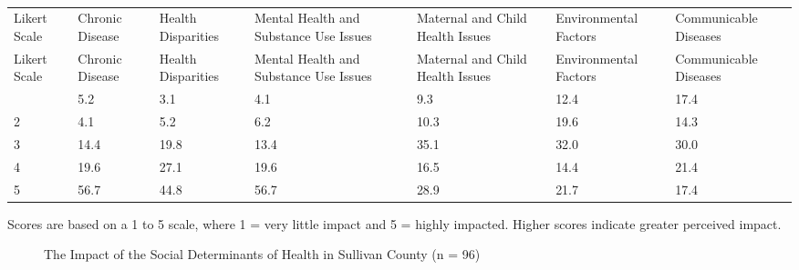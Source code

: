 \documentclass[
  english,
  letterpaper,
]{report}
\begin{document}
\begin{longtable}[]{@{}lllllll@{}}

\caption{\label{tbl-sc-impact-hlth-issue}The Impact of Health Issues in
Sullivan County (n = 98)}

\tabularnewline

\caption{}\label{T_33174}\tabularnewline
\toprule\noalign{}
Likert Scale & Chronic Disease & Health Disparities & Mental Health and
Substance Use Issues & Maternal and Child Health Issues & Environmental
Factors & Communicable Diseases \\
\midrule\noalign{}
\endfirsthead
\toprule\noalign{}
Likert Scale & Chronic Disease & Health Disparities & Mental Health and
Substance Use Issues & Maternal and Child Health Issues & Environmental
Factors & Communicable Diseases \\
\midrule\noalign{}
\endhead
\bottomrule\noalign{}
\endlastfoot
1 & 5.2 & 3.1 & 4.1 & 9.3 & 12.4 & 17.4 \\
2 & 4.1 & 5.2 & 6.2 & 10.3 & 19.6 & 14.3 \\
3 & 14.4 & 19.8 & 13.4 & 35.1 & 32.0 & 30.0 \\
4 & 19.6 & 27.1 & 19.6 & 16.5 & 14.4 & 21.4 \\
5 & 56.7 & 44.8 & 56.7 & 28.9 & 21.7 & 17.4 \\

\end{longtable}

\begin{tcolorbox}[enhanced jigsaw, breakable, leftrule=.75mm, title=\textcolor{quarto-callout-note-color}{\faInfo}\hspace{0.5em}{Note}, bottomrule=.15mm, opacityback=0, left=2mm, colback=white, bottomtitle=1mm, coltitle=black, colbacktitle=quarto-callout-note-color!10!white, colframe=quarto-callout-note-color-frame, opacitybacktitle=0.6, toptitle=1mm, titlerule=0mm, arc=.35mm, rightrule=.15mm, toprule=.15mm]

Scores are based on a 1 to 5 scale, where 1 = very little impact and 5 =
highly impacted. Higher scores indicate greater perceived impact.

\end{tcolorbox}

\begin{figure}


\caption{\label{fig-sc-impact-sdoh}The Impact of the Social Determinants
of Health in Sullivan County (n = 96)}

\end{figure}%
\end{document}
